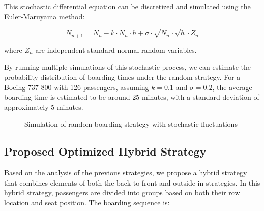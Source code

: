 \documentclass[12pt,a4paper]{article}
\begin{document}
This stochastic differential equation can be discretized and simulated using the Euler-Maruyama method:

\begin{equation}
N_{n+1} = N_n - k \cdot N_n \cdot h + \sigma \cdot \sqrt{N_n} \cdot \sqrt{h} \cdot Z_n
\label{eq:euler_maruyama}
\end{equation}

where $Z_n$ are independent standard normal random variables.

By running multiple simulations of this stochastic process, we can estimate the probability distribution of boarding times under the random strategy. For a Boeing 737-800 with 126 passengers, assuming $k = 0.1$ and $\sigma = 0.2$, the average boarding time is estimated to be around 25 minutes, with a standard deviation of approximately 5 minutes.

\begin{figure}[H]
\centering
{}
\caption{Simulation of random boarding strategy with stochastic fluctuations}
\label{fig:random_boarding}
\end{figure}

\subsection{Proposed Optimized Hybrid Strategy}

Based on the analysis of the previous strategies, we propose a hybrid strategy that combines elements of both the back-to-front and outside-in strategies. In this hybrid strategy, passengers are divided into groups based on both their row location and seat position. The boarding sequence is:
\end{document}

